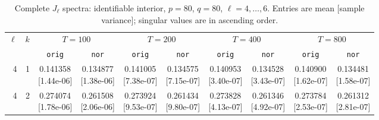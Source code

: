 \documentclass[12pt,letterpaper]{article}
\def\spacingset#1{\renewcommand{\baselinestretch}{#1}\small\normalsize}
\theoremstyle{plain}
\theoremstyle{definition}
\begin{document}
\clearpage
\begin{table}[p]
\begingroup
\spacingset{1.0}
\small\centering
\caption{Complete $J_\ell$ spectra: identifiable interior, $p=80$, $q=80$, $\ell=4,\ldots,6$. Entries are mean [sample variance]; singular values are in ascending order.}
\label{s23:lambda:alltab:spectra:p80q80interior:4-6}
\footnotesize
\setlength{\tabcolsep}{2.2pt}
\renewcommand{\arraystretch}{1.03}
\begin{adjustbox}{max width=\linewidth}
\begin{tabular}{@{}rr*{8}{c}@{}}
\toprule
$\ell$ & $k$ & \multicolumn{2}{c}{$T=100$} & \multicolumn{2}{c}{$T=200$} & \multicolumn{2}{c}{$T=400$} & \multicolumn{2}{c}{$T=800$}\\
\cmidrule(lr){3-4}\cmidrule(lr){5-6}\cmidrule(lr){7-8}\cmidrule(lr){9-10}
 &  & \texttt{orig} & \texttt{nor} & \texttt{orig} & \texttt{nor} & \texttt{orig} & \texttt{nor} & \texttt{orig} & \texttt{nor}\\
\midrule
4 & 1 & \shortstack{0.141358\\[-1pt]{\scriptsize[1.44e-06]}} & \shortstack{0.134877\\[-1pt]{\scriptsize[1.38e-06]}} & \shortstack{0.141005\\[-1pt]{\scriptsize[7.38e-07]}} & \shortstack{0.134575\\[-1pt]{\scriptsize[7.15e-07]}} & \shortstack{0.140953\\[-1pt]{\scriptsize[3.40e-07]}} & \shortstack{0.134528\\[-1pt]{\scriptsize[3.43e-07]}} & \shortstack{0.140900\\[-1pt]{\scriptsize[1.62e-07]}} & \shortstack{0.134481\\[-1pt]{\scriptsize[1.58e-07]}}\\
4 & 2 & \shortstack{0.274074\\[-1pt]{\scriptsize[1.78e-06]}} & \shortstack{0.261508\\[-1pt]{\scriptsize[2.06e-06]}} & \shortstack{0.273924\\[-1pt]{\scriptsize[9.53e-07]}} & \shortstack{0.261434\\[-1pt]{\scriptsize[9.80e-07]}} & \shortstack{0.273828\\[-1pt]{\scriptsize[4.13e-07]}} & \shortstack{0.261346\\[-1pt]{\scriptsize[4.92e-07]}} & \shortstack{0.273784\\[-1pt]{\scriptsize[2.53e-07]}} & \shortstack{0.261312\\[-1pt]{\scriptsize[2.81e-07]}}\\

\end{tabular}
\end{adjustbox}
\end{table}
\end{document}
